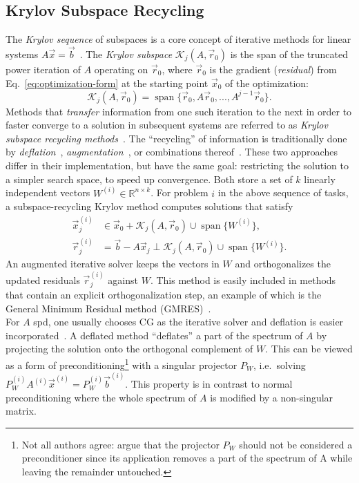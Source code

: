 \documentclass{article}
\newcommand{\spa}{\operatorname{span}}
\begin{document}
\subsection{Krylov Subspace Recycling}
The \emph{Krylov sequence} of subspaces is a core concept of iterative methods for linear systems $A\vec{x}=\vec{b}$~\cite{saad11}. The \emph{Krylov subspace} $\mathcal{K}_j(A,\vec{r}_0)$ is the span of the truncated power iteration of $A$ operating on $\vec{r}_0$, where $\vec{r}_{0}$ is the gradient (\emph{residual}) from Eq.~\eqref{eq:optimization-form} at the starting point $\vec{x}_0$ of the optimization:
\begin{equation}
\mathcal{K}_j(A,\vec{r}_0)=\spa\{\vec{r}_0,A\vec{r}_0,...,A^{j-1}\vec{r}_0\}.
\end{equation}
Methods that \emph{transfer} information from one such iteration to the next in order to faster converge to a solution in subsequent systems are referred to as \emph{Krylov subspace recycling methods}~\cite{parks06}. The ``recycling'' of information is traditionally done by \textit{deflation}~\cite{saad00,frank01}, \textit{augmentation}~\cite{gaul13,morgan95}, or combinations thereof~\cite{ebadi16,chapman97}. These two approaches differ in their implementation, but have the same goal: restricting the solution to a simpler search space, to speed up convergence. Both store a set of $k$ linearly independent vectors $W^{(i)}\in\mathbb{R}^{n\times k}$. For problem $i$ in the above sequence of tasks, a subspace-recycling Krylov method computes solutions that satisfy
\begin{align}
\vec{x}_j ^{(i)}&\in \vec{x}_0+\mathcal{K}_j(A,\vec{r}_0) \cup \spa\{W^{(i)}\}, \\
\vec{r}_j ^{(i)}&= \vec{b}-A\vec{x}_j \perp \mathcal{K}_j(A,\vec{r}_0) \cup \spa\{W^{(i)}\}. \label{eq:res}
\end{align}
An augmented iterative solver keeps the vectors in $W$ and orthogonalizes the updated residuals $\vec{r}_j ^{(i)}$ against $W$. This method is easily included in methods that contain an explicit orthogonalization step, an example of which is the General Minimum Residual method (GMRES)~\cite{morgan95}.\\
For $A$ spd, one usually chooses CG as the iterative solver and deflation is easier incorporated~\cite{saad00}. A deflated method ``deflates'' a part of the spectrum of $A$ by projecting the solution onto the orthogonal complement of $W$. This can be viewed as a form of preconditioning\footnote{Not all authors agree: \citet{gaul13} argue that the projector $P_W$ should not be considered a preconditioner since its application removes a part of the spectrum of A while leaving the remainder untouched.} with a singular projector $P_W$, i.e.~solving $P^{(i)}_W A^{(i)
} \vec{x}^{(i)}=P^{(i)}_W\vec{b}^{(i)}$. This property is in contrast to normal preconditioning where the whole spectrum of $A$ is modified by a non-singular matrix.  %
\end{document}
